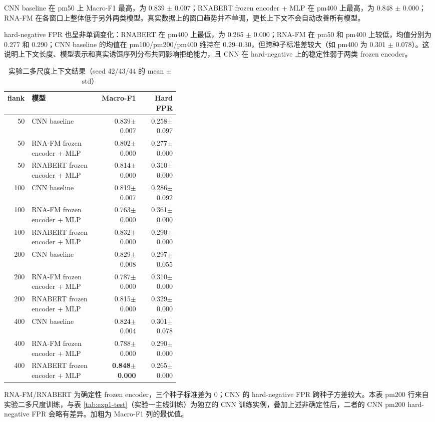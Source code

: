 \documentclass[
    oneside,
    fontset = win,
  ]{njuthesis}
\begin{document}
CNN baseline 在 pm50 上 Macro-F1 最高，为 0.839 $\pm$ 0.007；RNABERT frozen encoder + MLP 在 pm400 上最高，为 0.848 $\pm$ 0.000；RNA-FM 在各窗口上整体低于另外两类模型。真实数据上的窗口趋势并不单调，更长上下文不会自动改善所有模型。

hard-negative FPR 也呈非单调变化：RNABERT 在 pm400 上最低，为 0.265 $\pm$ 0.000；RNA-FM 在 pm50 和 pm400 上较低，均值分别为 0.277 和 0.290；CNN baseline 的均值在 pm100/pm200/pm400 维持在 0.29--0.30，但跨种子标准差较大（如 pm400 为 0.301 $\pm$ 0.078）。这说明上下文长度、模型表示和真实诱饵序列分布共同影响拒绝能力，且 CNN 在 hard-negative 上的稳定性弱于两类 frozen encoder。

\begin{table}[H]
  \centering
  \caption{实验二多尺度上下文结果（seed 42/43/44 的 mean $\pm$ std）}
  \label{tab:exp2-context}
  \small
  \setlength{\tabcolsep}{4pt}
  \begin{tabular}{r>{\raggedright\arraybackslash}p{0.40\linewidth}rr}
    \hline
    flank & 模型 & Macro-F1 & Hard FPR \\
    \hline
    50  & CNN baseline & 0.839$\pm$0.007 & 0.258$\pm$0.097 \\
    50  & RNA-FM frozen encoder + MLP & 0.802$\pm$0.000 & 0.277$\pm$0.000 \\
    50  & RNABERT frozen encoder + MLP & 0.814$\pm$0.000 & 0.310$\pm$0.000 \\
    100 & CNN baseline & 0.819$\pm$0.007 & 0.286$\pm$0.092 \\
    100 & RNA-FM frozen encoder + MLP & 0.763$\pm$0.000 & 0.361$\pm$0.000 \\
    100 & RNABERT frozen encoder + MLP & 0.832$\pm$0.000 & 0.290$\pm$0.000 \\
    200 & CNN baseline & 0.829$\pm$0.008 & 0.297$\pm$0.055 \\
    200 & RNA-FM frozen encoder + MLP & 0.787$\pm$0.000 & 0.310$\pm$0.000 \\
    200 & RNABERT frozen encoder + MLP & 0.815$\pm$0.000 & 0.329$\pm$0.000 \\
    400 & CNN baseline & 0.824$\pm$0.004 & 0.301$\pm$0.078 \\
    400 & RNA-FM frozen encoder + MLP & 0.788$\pm$0.000 & 0.290$\pm$0.000 \\
    400 & RNABERT frozen encoder + MLP & \textbf{0.848$\pm$0.000} & 0.265$\pm$0.000 \\
    \hline
  \end{tabular}

  {\footnotesize RNA-FM/RNABERT 为确定性 frozen encoder，三个种子标准差为 0；CNN 的 hard-negative FPR 跨种子方差较大。本表 pm200 行来自实验二多尺度训练，与表 \ref{tab:exp1-test}（实验一主线训练）为独立的 CNN 训练实例，叠加上述非确定性后，二者的 CNN pm200 hard-negative FPR 会略有差异。加粗为 Macro-F1 列的最优值。}
\end{table}
\end{document}
